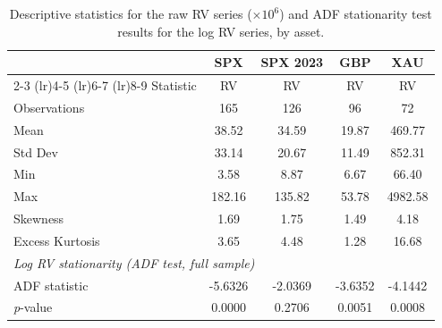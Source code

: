 \documentclass[12pt,a4paper]{report}
\begin{document}
\begin{table}[H]
\centering
\begin{tabular}{lcccccccc}
\toprule
 & \multicolumn{2}{c}{SPX} & \multicolumn{2}{c}{SPX 2023} & \multicolumn{2}{c}{GBP} & \multicolumn{2}{c}{XAU} \\
\cmidrule(lr){2-3} \cmidrule(lr){4-5} \cmidrule(lr){6-7} \cmidrule(lr){8-9}
Statistic & \multicolumn{2}{c}{RV} & \multicolumn{2}{c}{RV} & \multicolumn{2}{c}{RV} & \multicolumn{2}{c}{RV} \\
\midrule
Observations    & \multicolumn{2}{c}{165}    & \multicolumn{2}{c}{126}    & \multicolumn{2}{c}{96}     & \multicolumn{2}{c}{72}      \\
Mean            & \multicolumn{2}{c}{38.52}  & \multicolumn{2}{c}{34.59}  & \multicolumn{2}{c}{19.87}  & \multicolumn{2}{c}{469.77}  \\
Std Dev         & \multicolumn{2}{c}{33.14}  & \multicolumn{2}{c}{20.67}  & \multicolumn{2}{c}{11.49}  & \multicolumn{2}{c}{852.31}  \\
Min             & \multicolumn{2}{c}{3.58}   & \multicolumn{2}{c}{8.87}   & \multicolumn{2}{c}{6.67}   & \multicolumn{2}{c}{66.40}   \\
Max             & \multicolumn{2}{c}{182.16} & \multicolumn{2}{c}{135.82} & \multicolumn{2}{c}{53.78}  & \multicolumn{2}{c}{4982.58} \\
Skewness        & \multicolumn{2}{c}{1.69}   & \multicolumn{2}{c}{1.75}   & \multicolumn{2}{c}{1.49}   & \multicolumn{2}{c}{4.18}    \\
Excess Kurtosis & \multicolumn{2}{c}{3.65}   & \multicolumn{2}{c}{4.48}   & \multicolumn{2}{c}{1.28}   & \multicolumn{2}{c}{16.68}   \\
\midrule
\multicolumn{9}{l}{\textit{Log RV stationarity (ADF test, full sample)}} \\
ADF statistic       & \multicolumn{2}{c}{-5.6326} & \multicolumn{2}{c}{-2.0369} & \multicolumn{2}{c}{-3.6352} & \multicolumn{2}{c}{-4.1442} \\
\textit{p}-value    & \multicolumn{2}{c}{0.0000} & \multicolumn{2}{c}{0.2706} & \multicolumn{2}{c}{0.0051} & \multicolumn{2}{c}{0.0008} \\
\bottomrule
\end{tabular}
\caption{Descriptive statistics for the raw RV series ($\times 10^{6}$) and ADF stationarity test results for the log RV series, by asset.}
\label{tab:summary_stats}
\end{table}
\end{document}
